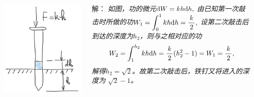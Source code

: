 \begin{frame}
	\linespread{1.5}
	\pause
	
	\bigskip
	
	\begin{columns}
		\begin{column}{.35\textwidth}
			\begin{center}
				\includegraphics[width=\textwidth]{./images/ch6/nailSt.jpg}
			\end{center}		
		\end{column}
		\begin{column}{.65\textwidth}
			\small 解：\it
			如图，功的微元$\mathrm{d} W=kh\mathrm{d} h,$
			由已知第一次敲击时所做的功$W_1=\displaystyle\int_0^1kh\mathrm{d} h=\displaystyle\frac{\,{k}\,}{\,{2}\,},$
			设第二次敲击后到达的深度为$h_2$，则与之相对应的功
			$$W_2=\displaystyle\int_1^{h_2}kh\mathrm{d} h=\displaystyle\frac{\,{k}\,}{\,{2}\,}(h^2_2-1)=W_1=\displaystyle\frac{\,{k}\,}{\,{2}\,},$$
			解得$h_2=\sqrt2$。故第二次敲击后，铁钉又将进入的深度为
			$\sqrt2-1$。
		\end{column}
	\end{columns}
\end{frame}

